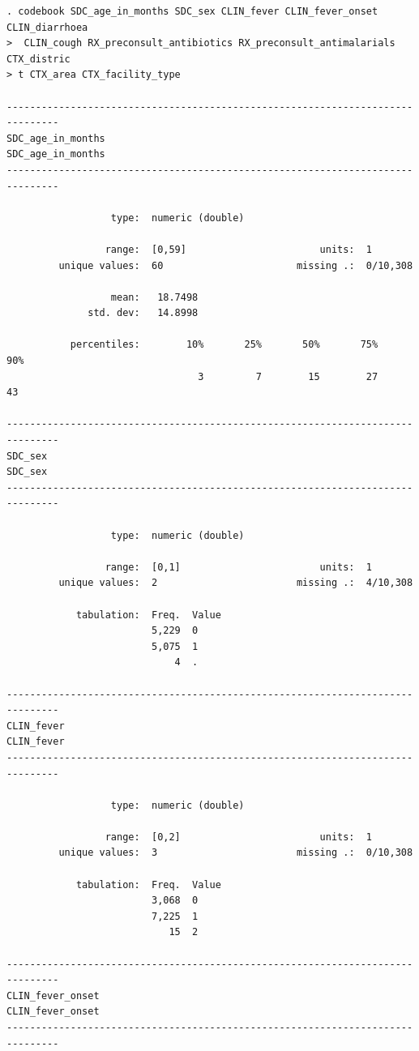 \documentclass[
  letterpaper,
  DIV=11,
  numbers=noendperiod,
  oneside]{scrreprt}
\begin{document}
\begin{verbatim}
. codebook SDC_age_in_months SDC_sex CLIN_fever CLIN_fever_onset CLIN_diarrhoea
>  CLIN_cough RX_preconsult_antibiotics RX_preconsult_antimalarials CTX_distric
> t CTX_area CTX_facility_type

-------------------------------------------------------------------------------
SDC_age_in_months                                             SDC_age_in_months
-------------------------------------------------------------------------------

                  type:  numeric (double)

                 range:  [0,59]                       units:  1
         unique values:  60                       missing .:  0/10,308

                  mean:   18.7498
              std. dev:   14.8998

           percentiles:        10%       25%       50%       75%       90%
                                 3         7        15        27        43

-------------------------------------------------------------------------------
SDC_sex                                                                 SDC_sex
-------------------------------------------------------------------------------

                  type:  numeric (double)

                 range:  [0,1]                        units:  1
         unique values:  2                        missing .:  4/10,308

            tabulation:  Freq.  Value
                         5,229  0
                         5,075  1
                             4  .

-------------------------------------------------------------------------------
CLIN_fever                                                           CLIN_fever
-------------------------------------------------------------------------------

                  type:  numeric (double)

                 range:  [0,2]                        units:  1
         unique values:  3                        missing .:  0/10,308

            tabulation:  Freq.  Value
                         3,068  0
                         7,225  1
                            15  2

-------------------------------------------------------------------------------
CLIN_fever_onset                                               CLIN_fever_onset
-------------------------------------------------------------------------------


\end{verbatim}
\end{document}

